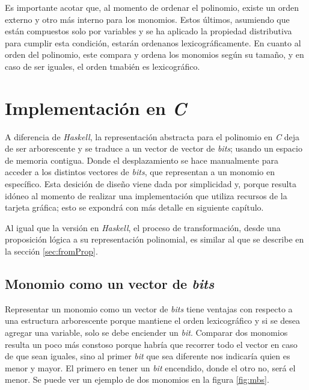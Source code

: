 
Es importante acotar que, al momento de ordenar el polinomio, existe un orden externo y otro más interno para los monomios. Estos últimos, asumiendo que están compuestos solo por variables y se ha aplicado la propiedad distributiva para cumplir esta condición, estarán ordenanos lexicográficamente. En cuanto al orden del polinomio, este compara y ordena los monomios según su tamaño, y en caso de ser iguales, el orden tmabién es lexicográfico.


\section{Implementación en \textit{C}}

A diferencia de \textit{Haskell}, la representación abstracta para el polinomio en \textit{C} deja de ser arborescente y se traduce a un vector de vector de \textit{bits}; usando un espacio de memoria contigua. Donde el desplazamiento se hace manualmente para acceder a los distintos vectores de \textit{bits}, que representan a un monomio en específico. Esta desición de diseño viene dada por simplicidad y, porque resulta idóneo al momento de realizar una implementación que utiliza recursos de la tarjeta gráfica; esto se expondrá con más detalle en siguiente capítulo.

Al igual que la versión en \textit{Haskell}, el proceso de transformación, desde una proposición lógica a su representación polinomial, es similar al que se describe en la sección \ref{sec:fromProp}.

\subsection{Monomio como un vector de \textit{bits}}

Representar un monomio como un vector de \textit{bits} tiene ventajas con respecto a una estructura arborescente porque mantiene el orden lexicográfico y si se desea agregar una variable, solo se debe enciender un \textit{bit}. Comparar dos monomios resulta un poco más constoso porque habría que recorrer todo el vector en caso de que sean iguales, sino al primer \textit{bit} que sea diferente nos indicaría quien es menor y mayor. El primero en tener un \textit{bit} encendido, donde el otro no, será el menor. Se puede ver un ejemplo de dos monomios en la figura \ref{fig:mbs}.


